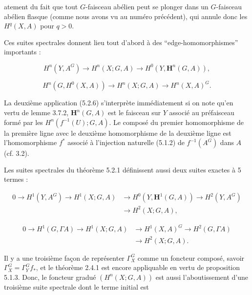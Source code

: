 \clearpage
{}

\noindent atement du fait que tout $G$-faisceau abélien peut se plonger dans
un $G$-faisceau abélien flasque (comme nous avons vu au numéro précédent),
qui annule donc les $H^q(X,A)$ pour $q>0$.

Ces suites spectrales donnent lieu tout d'abord à des
``edge-homomorphismes'' importants :

\[
H^n(Y,A^G)\to H^n(X;G,A)
\to H^0(Y,\mathbf H^n(G,A)),
\tag{5.2.6}
\]

\[
H^n(G,H^0(X,A))\to H^n(X;G,A)
\to H^n(X,A)^G.
\tag{5.2.7}
\]

La deuxième application (5.2.6) s'interprète immédiatement si on note qu'en
vertu de lemme 3.7.2, $\mathbf H^n(G,A)$ est le faisceau sur $Y$ associé au
préfaisceau formé par les $H^n(f^{-1}(U);G,A)$. Le composé du premier
homomorphisme de la première ligne avec le deuxième homomorphisme de la
deuxième ligne est l'homomorphisme $f^*$ associé à l'injection naturelle
(5.1.2) de $f^{-1}(A^G)$ dans $A$ (cf. 3.2).

Les suites spectrales du théorème 5.2.1 définissent aussi deux suites exactes
à 5 termes :

\[
\tag{5.2.8}
\begin{aligned}
0\to H^1(Y,A^G)\to H^1(X;G,A)
&\to H^0(Y,\mathbf H^1(G,A))\to H^2(Y,A^G)\\
&\to H^2(X;G,A),
\end{aligned}
\]

\[
\tag{5.2.9}
\begin{aligned}
0\to H^1(G,\Gamma A)\to H^1(X;G,A)
&\to H^1(X,A)^G\to H^2(G,\Gamma A)\\
&\to H^2(X;G,A).
\end{aligned}
\]

Il y a une troisième façon de représenter $\Gamma_X^G$ comme un foncteur
composé, savoir $\Gamma_X^G=\Gamma_Y^Gf_*$, et le théorème 2.4.1 est encore
appliquable en vertu de proposition 5.1.3. Donc, le foncteur gradué
$(H^n(X;G,A))$ est aussi l'aboutissement d'une troisième suite spectrale dont
le terme initial est

